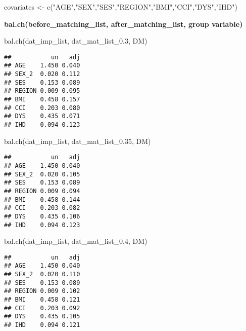 \documentclass[
]{book}
\newenvironment{Shaded}{\begin{snugshade}}{\end{snugshade}}
\newcommand{\FloatTok}[1]{\textcolor[rgb]{0.00,0.00,0.81}{#1}}
\newcommand{\FunctionTok}[1]{\textcolor[rgb]{0.00,0.00,0.00}{#1}}
\newcommand{\NormalTok}[1]{#1}
\newcommand{\OtherTok}[1]{\textcolor[rgb]{0.56,0.35,0.01}{#1}}
\newcommand{\StringTok}[1]{\textcolor[rgb]{0.31,0.60,0.02}{#1}}
\begin{document}
\begin{Shaded}
\begin{Highlighting}[]
\NormalTok{covariates }\OtherTok{\textless{}{-}} \FunctionTok{c}\NormalTok{(}\StringTok{"AGE"}\NormalTok{,}\StringTok{"SEX"}\NormalTok{,}\StringTok{"SES"}\NormalTok{,}\StringTok{"REGION"}\NormalTok{,}\StringTok{"BMI"}\NormalTok{,}\StringTok{"CCI"}\NormalTok{,}\StringTok{"DYS"}\NormalTok{,}\StringTok{"IHD"}\NormalTok{)}
\end{Highlighting}
\end{Shaded}

\textbf{bal.ch(before\_matching\_list, after\_matching\_list, group variable)}

\begin{Shaded}
\begin{Highlighting}[]
\FunctionTok{bal.ch}\NormalTok{(dat\_imp\_list, dat\_mat\_list\_0}\FloatTok{.3}\NormalTok{, DM)}
\end{Highlighting}
\end{Shaded}

\begin{verbatim}
##           un   adj
## AGE    1.450 0.040
## SEX_2  0.020 0.112
## SES    0.153 0.089
## REGION 0.009 0.095
## BMI    0.458 0.157
## CCI    0.203 0.080
## DYS    0.435 0.071
## IHD    0.094 0.123
\end{verbatim}

\begin{Shaded}
\begin{Highlighting}[]
\FunctionTok{bal.ch}\NormalTok{(dat\_imp\_list, dat\_mat\_list\_0}\FloatTok{.35}\NormalTok{, DM)}
\end{Highlighting}
\end{Shaded}

\begin{verbatim}
##           un   adj
## AGE    1.450 0.040
## SEX_2  0.020 0.105
## SES    0.153 0.089
## REGION 0.009 0.094
## BMI    0.458 0.144
## CCI    0.203 0.082
## DYS    0.435 0.106
## IHD    0.094 0.123
\end{verbatim}

\begin{Shaded}
\begin{Highlighting}[]
\FunctionTok{bal.ch}\NormalTok{(dat\_imp\_list, dat\_mat\_list\_0}\FloatTok{.4}\NormalTok{, DM)}
\end{Highlighting}
\end{Shaded}

\begin{verbatim}
##           un   adj
## AGE    1.450 0.040
## SEX_2  0.020 0.110
## SES    0.153 0.089
## REGION 0.009 0.102
## BMI    0.458 0.121
## CCI    0.203 0.092
## DYS    0.435 0.105
## IHD    0.094 0.121
\end{verbatim}
\end{document}
